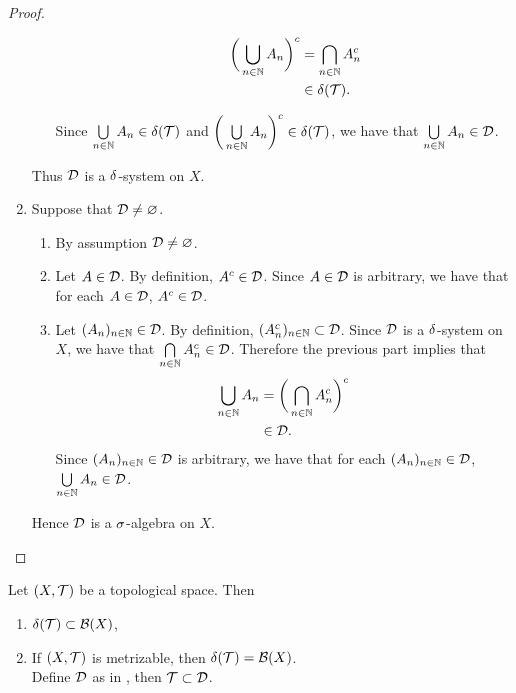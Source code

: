 \documentclass{book}
\begin{document}
\begin{proof}
\begin{enumerate}
\begin{enumerate}
\begin{itemize}
					\begin{align*}
						\bigg( \bigcup_{n \in \mathbb{N}} A_n \bigg)^c 
						& = \bigcap_{n \in \mathbb{N}} A_n^c \\
						& \in \delta(\mathcal{T}).
					\end{align*}
				\end{itemize}
				Since $\bigcup\limits_{n \in \mathbb{N}} A_n \in \delta(\mathcal{T})$ and $\bigg( \bigcup\limits_{n \in \mathbb{N}} A_n \bigg)^c \in \delta(\mathcal{T})$, we have that $\bigcup\limits_{n \in \mathbb{N}} A_n \in \mathcal{D}$. 
			\end{enumerate}
			Thus $\mathcal{D}$ is a $\delta$-system on $X$.
			\item Suppose that $\mathcal{D} \neq \varnothing$.
			\begin{enumerate}
				\item By assumption $\mathcal{D} \neq \varnothing$.
				\item Let $A \in \mathcal{D}$. By definition, $A^c \in \mathcal{D}$. Since $A \in \mathcal{D}$ is arbitrary, we have that for each $A \in \mathcal{D}$, $A^c \in \mathcal{D}$.
				\item Let $(A_n)_{n \in \mathbb{N}} \in \mathcal{D}$. By definition, $(A_n^c)_{n \in \mathbb{N}} \subset \mathcal{D}$. Since $\mathcal{D}$ is a $\delta$-system on $X$, we have that $\bigcap\limits_{n \in \mathbb{N}} A_n^c \in \mathcal{D}$. Therefore the previous part implies that
				\begin{align*}
					\bigcup_{n \in \mathbb{N}} A_n
					& = \bigg( \bigcap_{n \in \mathbb{N}} A_n^c \bigg)^c \\
					& \in \mathcal{D}. 
				\end{align*}
				Since $(A_n)_{n \in \mathbb{N}} \in \mathcal{D}$ is arbitrary, we have that for each $(A_n)_{n \in \mathbb{N}} \in \mathcal{D}$, $\bigcup\limits_{n \in \mathbb{N}} A_n \in \mathcal{D}$. 
			\end{enumerate}
			Hence $\mathcal{D}$ is a $\sigma$-algebra on $X$. 
		\end{enumerate}
	\end{proof}
	
	\begin{ex} 
		Let $(X, \mathcal{T})$ be a topological space. Then 
		\begin{enumerate}
			\item $\delta(\mathcal{T}) \subset \mathcal{B}(X)$,
			\item If $(X, \mathcal{T})$ is metrizable, then $\delta(\mathcal{T}) = \mathcal{B}(X)$.  \\
			 Define $\mathcal{D}$ as in , then $\mathcal{T} \subset \mathcal{D}$.
		\end{enumerate}
	\end{ex}
\end{document}
